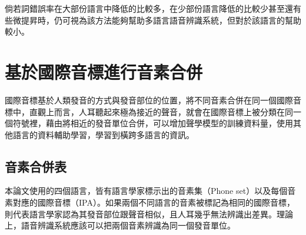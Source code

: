 倘若詞錯誤率在大部份語言中降低的比較多，在少部份語言降低的比較少甚至還有些微提昇時，仍可視為該方法能夠幫助多語言語音辨識系統，但對於該語言的幫助較小。


\section{基於國際音標進行音素合併}

國際音標基於人類發音的方式與發音部位的位置，將不同音素合併在同一個國際音標中，直觀上而言，人耳聽起來極為接近的聲音，就會在國際音標上被分類在同一個符號裡，藉由將相近的發音單位合併，可以增加聲學模型的訓練資料量，使用其他語言的資料輔助學習，學習到橫跨多語言的資訊。

\subsection{音素合併表}
本論文使用的四個語言，皆有語言學家標示出的音素集（Phone set）以及每個音素對應的國際音標（IPA）。如果兩個不同語言的音素被標記為相同的國際音標，則代表語言學家認為其發音部位跟聲音相似，且人耳幾乎無法辨識出差異。理論上，語音辨識系統應該可以把兩個音素辨識為同一個發音單位。


